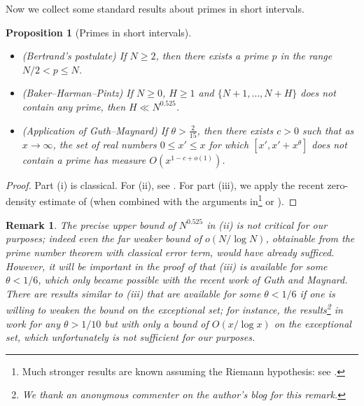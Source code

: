 \documentclass[12pt]{amsart}
\newtheorem{proposition}[theorem]{Proposition}
\newtheorem{remark}[theorem]{Remark}
\begin{document}
Now we collect some standard results about primes in short intervals.

\begin{proposition}[Primes in short intervals]\label{prime-interval}\
    \begin{itemize}
        \item[(i)]  (Bertrand's postulate) If $N \geq 2$, then there exists a prime $p$ in the range $N/2 < p \leq N$.
        \item[(ii)]  (Baker--Harman--Pintz) If $N \geq 0$, $H \geq 1$ and $\{N+1,\dots,N+H\}$ does not contain any prime, then $H \ll N^{0.525}$.
        \item[(iii)] (Application of Guth--Maynard) If $\theta > \frac{2}{15}$, then there exists $c>0$ such that as $x \to \infty$, the set of real numbers $0 \leq x' \leq x$ for which $[x', x'+x^\theta]$ does not contain a prime has measure $O(x^{1-c+o(1)})$.
    \end{itemize}
\end{proposition}

\begin{proof} Part (i) is classical.  For (ii), see \cite{bhp}.  For part (iii), we apply the recent zero-density estimate of \cite{guth-maynard} (when combined with the arguments in\footnote{Much stronger results are known assuming the Riemann hypothesis: see \cite{hb}.} \cite{gafni-tao} or \cite[Theorem 2(i)]{bazzanella}).
\end{proof}



\begin{remark}\label{rem-bounds}  The precise upper bound of $N^{0.525}$ in (ii) is not critical for our purposes; indeed even the far weaker bound of $o(N / \log N)$, obtainable from the prime number theorem with classical error term, would have already sufficed.  However, it will be important in the proof of  that (iii) is available for some $\theta < 1/6$, which only became possible with the recent work of Guth and Maynard.  There are results similar to (iii) that are available for some $\theta < 1/6$ if one is willing to weaken the bound on the exceptional set; for instance, the results\footnote{We thank an anonymous commenter on the author's blog for this remark.} in \cite{harman} work for any $\theta > 1/10$ but with only a bound of $O(x/\log x)$ on the exceptional set, which unfortunately is not sufficient for our purposes.
\end{remark}
\end{document}
